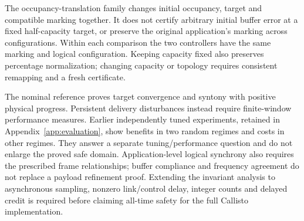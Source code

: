 The occupancy-translation family changes initial occupancy, target
and compatible marking together. It does not certify arbitrary
initial buffer error at a fixed half-capacity target, or preserve
the original application's marking across configurations. Within
each comparison the two controllers have the same marking and
logical configuration. Keeping capacity fixed also preserves
percentage normalization; changing capacity or topology requires
consistent remapping and a fresh certificate.

The nominal reference proves target convergence and syntony with
positive physical progress. Persistent delivery disturbances instead
require finite-window performance measures. Earlier independently
tuned experiments, retained in Appendix~\ref{app:evaluation}, show
benefits in two random regimes and costs in other regimes. They
answer a separate tuning/performance question and do not enlarge
the proved safe domain. Application-level logical synchrony also
requires the prescribed frame relationships; buffer compliance and
frequency agreement do not replace a payload refinement proof.
Extending the invariant analysis to asynchronous sampling, nonzero
link/control delay, integer counts and delayed credit is required
before claiming all-time safety for the full Callisto implementation.

